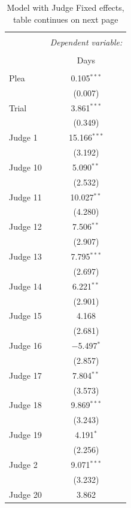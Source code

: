 \documentclass[11pt]{article}
\begin{document}
    \begin{table}[H] \centering
      \caption{Model with Judge Fixed effects, table continues on next page}
      \small
      \begin{tabular}{@{\extracolsep{5pt}}lc}
      \\[-1.8ex]\hline
      \hline \\[-1.8ex]
       & \multicolumn{1}{c}{\textit{Dependent variable:}} \\
      \cline{2-2}
      \\[-1.8ex] & Days \\
      \hline \\[-1.8ex]
       Plea & 0.105$^{***}$ \\
        & (0.007) \\
        Trial & 3.861$^{***}$ \\
        & (0.349) \\
        Judge 1 & 15.166$^{***}$ \\
        & (3.192) \\
        Judge 10 & 5.090$^{**}$ \\
        & (2.532) \\
        Judge 11 & 10.027$^{**}$ \\
        & (4.280) \\
        Judge 12 & 7.506$^{**}$ \\
        & (2.907) \\
        Judge 13 & 7.795$^{***}$ \\
        & (2.697) \\
        Judge 14 & 6.221$^{**}$ \\
        & (2.901) \\
        Judge 15 & 4.168 \\
        & (2.681) \\
        Judge 16 & $-$5.497$^{*}$ \\
        & (2.857) \\
        Judge 17 & 7.804$^{**}$ \\
        & (3.573) \\
        Judge 18 & 9.869$^{***}$ \\
        & (3.243) \\
        Judge 19 & 4.191$^{*}$ \\
        & (2.256) \\
        Judge 2 & 9.071$^{***}$ \\
        & (3.232) \\
        Judge 20 & 3.862 \\

\end{tabular}
\end{table}
\end{document}

